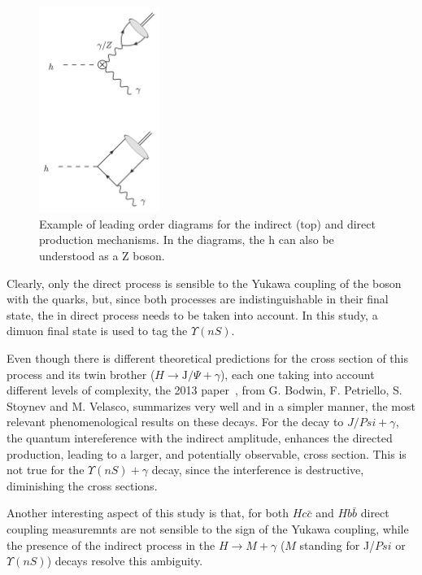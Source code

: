 \begin{figure}[!htbp]
  \begin{center}
  \includegraphics[width=0.35\textwidth ]{figures/theory/direct_indirect.png}
  \end{center}\vspace*{-.5cm}
  \caption{Example of leading order diagrams for the indirect (top) and direct production mechanisms. In the diagrams, the h can also be understood as a Z boson.}
  \label{direct_indirect}
  \end{figure} 

Clearly, only the direct process is sensible to the Yukawa coupling of the boson with the quarks, but, since both processes are indistinguishable in their final state, the in direct process needs to be taken into account. In this study, a dimuon final state is used to tag the $\Upsilon(nS)$.

Even though there is different theoretical predictions for the cross section of this process and its twin brother ($H \rightarrow \text{J/}\Psi + \gamma$), each one taking into account different levels of complexity, the 2013 paper~\cite{PhysRevD.88.053003}, from G. Bodwin, F. Petriello, S. Stoynev and M. Velasco, summarizes very well and in a simpler manner, the most relevant phenomenological results on these decays. For the decay to $J/Psi + \gamma$, the quantum intereference with the indirect amplitude, enhances the directed production, leading to a larger, and potentially observable, cross section. This is not true for the $\Upsilon(nS) + \gamma$ decay, since the interference is destructive, diminishing the cross sections. 

Another interesting aspect of this study is that, for both $Hc\bar{c}$ and $Hb\bar{b}$ direct coupling measuremnts are not sensible to the sign of the Yukawa coupling, while the presence of the indirect process in the $H \rightarrow M + \gamma$ ($M$ standing for J/$Psi$ or $\Upsilon(nS)$) decays resolve this ambiguity.

